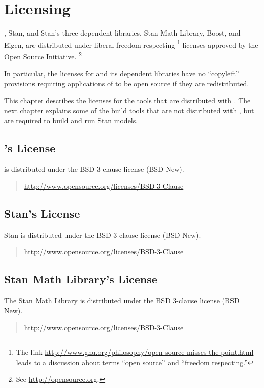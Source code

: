 \chapter{Licensing}\label{licensing.appendix}

\noindent
\CmdStan, Stan, and Stan's three dependent libraries, Stan Math Library, Boost, and Eigen, are
distributed under liberal freedom-respecting%
%
\footnote{The link
  \url{http://www.gnu.org/philosophy/open-source-misses-the-point.html}
  leads to a discussion about terms ``open
  source'' and ``freedom respecting.''}
%
licenses approved by the Open Source Initiative.%
\footnote{See \url{http://opensource.org}.}  

In particular, the licenses for \CmdStan and its dependent libraries
have no ``copyleft'' provisions requiring applications of \CmdStan to
be open source if they are redistributed.

This chapter describes the licenses for the tools that are distributed
with \CmdStan.  The next chapter explains some of the build tools that
are not distributed with \CmdStan, but are required to build and run
Stan models.

\section{\CmdStan's License}

\CmdStan is distributed under the BSD 3-clause license (BSD New).
%
\begin{quote}
\url{http://www.opensource.org/licenses/BSD-3-Clause}
\end{quote}

\section{Stan's License}

Stan is distributed under the BSD 3-clause license (BSD New).
%
\begin{quote}
\url{http://www.opensource.org/licenses/BSD-3-Clause}
\end{quote}

\section{Stan Math Library's License}

The Stan Math Library is distributed under the BSD 3-clause license (BSD New).
%
\begin{quote}
\url{http://www.opensource.org/licenses/BSD-3-Clause}
\end{quote}

